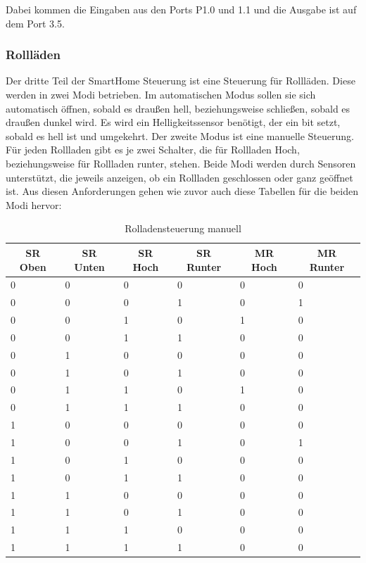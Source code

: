 Dabei kommen die Eingaben aus den Ports P1.0 und 1.1 und die Ausgabe ist auf dem Port 3.5.

\subsubsection{Rollläden}
Der dritte Teil der SmartHome Steuerung ist eine Steuerung für Rollläden. Diese werden in zwei Modi betrieben. Im automatischen Modus sollen sie sich automatisch öffnen, sobald es draußen hell, beziehungsweise schließen, sobald es draußen dunkel wird. Es wird ein Helligkeitssensor benötigt, der ein bit setzt, sobald es hell ist und umgekehrt. Der zweite Modus ist eine manuelle Steuerung. Für jeden Rollladen gibt es je zwei Schalter, die für Rollladen Hoch, beziehungsweise für Rollladen runter, stehen. Beide Modi werden durch Sensoren unterstützt, die jeweils anzeigen, ob ein Rollladen geschlossen oder ganz geöffnet ist. 
Aus diesen Anforderungen gehen wie zuvor auch diese Tabellen für die beiden Modi hervor:

\begin{table}[]
\centering
\caption{Rolladensteuerung manuell}
\label{my-label}
\begin{tabular}{|l|l|l|l|l|l|}
\hline
\multicolumn{1}{|c|}{\textbf{SR Oben}} & \multicolumn{1}{c|}{\textbf{SR Unten}} & \multicolumn{1}{c|}{\textbf{SR Hoch}} & \multicolumn{1}{c|}{\textbf{SR Runter}} & \multicolumn{1}{c|}{\textbf{MR Hoch}} & \multicolumn{1}{c|}{\textbf{MR Runter}} \\ \hline
 0 & 0 & 0 & 0 & 0 & 0 \\ \hline
 0 & 0 & 0 & 1 & 0 & 1 \\ \hline
 0 & 0 & 1 & 0 & 1 & 0 \\ \hline
 0 & 0 & 1 & 1 & 0 & 0 \\ \hline
 0 & 1 & 0 & 0 & 0 & 0 \\ \hline
 0 & 1 & 0 & 1 & 0 & 0 \\ \hline
 0 & 1 & 1 & 0 & 1 & 0 \\ \hline
 0 & 1 & 1 & 1 & 0 & 0 \\ \hline
 1 & 0 & 0 & 0 & 0 & 0 \\ \hline
 1 & 0 & 0 & 1 & 0 & 1 \\ \hline
 1 & 0 & 1 & 0 & 0 & 0 \\ \hline
 1 & 0 & 1 & 1 & 0 & 0 \\ \hline
 1 & 1 & 0 & 0 & 0 & 0 \\ \hline
 1 & 1 & 0 & 1 & 0 & 0 \\ \hline
 1 & 1 & 1 & 0 & 0 & 0 \\ \hline
 1 & 1 & 1 & 1 & 0 & 0 \\ \hline
\end{tabular}
\end{table}


